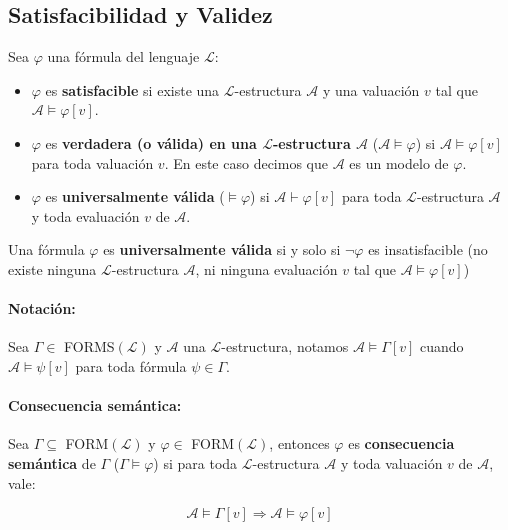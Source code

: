 \subsection{Satisfacibilidad y Validez}
Sea $\varphi$ una fórmula del lenguaje $\mathcal{L}$:
\begin{itemize}
	\item $\varphi$ es \textbf{satisfacible} si existe una $\mathcal{L}$-estructura $\mathcal{A}$ y una valuación $v$ tal que $\mathcal{A}\vDash\varphi[v]$.
	
	\item $\varphi$ es \textbf{verdadera (o válida) en una $\mathcal{L}$-estructura $\mathcal{A}$} ($\mathcal{A}\vDash\varphi$) si $\mathcal{A}\vDash\varphi[v]$ para toda valuación $v$. En este caso decimos que $\mathcal{A}$ es un modelo de $\varphi$.
	
	\item $\varphi$ es \textbf{universalmente válida} ($\vDash\varphi$) si $\mathcal{A}\vdash\varphi[v]$ para toda $\mathcal{L}$-estructura $\mathcal{A}$ y toda evaluación $v$ de $\mathcal{A}$.
\end{itemize} 

\begin{proposicion}
	Una fórmula $\varphi$ es \textbf{universalmente válida} si y solo si $\lnot\varphi$ es insatisfacible (no existe ninguna $\mathcal{L}$-estructura $\mathcal{A}$, ni ninguna evaluación $v$ tal que $\mathcal{A}\vDash\varphi[v]$)
\end{proposicion}

\paragraph{Notación:} 	Sea $\Gamma\in$ FORMS$(\mathcal{L})$ y $\mathcal{A}$ una $\mathcal{L}$-estructura, notamos $\mathcal{A}\vDash\Gamma[v]$ cuando $\mathcal{A}\vDash\psi[v]$ para toda fórmula $\psi\in\Gamma$.

\paragraph{Consecuencia semántica:} Sea $\Gamma\subseteq$ FORM$(\mathcal{L})$ y $\varphi\in$ FORM$(\mathcal{L})$, entonces $\varphi$ es \textbf{consecuencia semántica} de $\Gamma$ ($\Gamma\vDash\varphi$) si para toda $\mathcal{L}$-estructura $\mathcal{A}$ y  toda valuación $v$ de $\mathcal{A}$, vale:

$$\mathcal{A}\vDash\Gamma[v] \Rightarrow \mathcal{A}\vDash\varphi[v]$$

